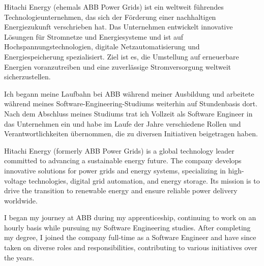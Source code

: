 \begin{cvparagraph}
	{
		Hitachi Energy (ehemals ABB Power Grids) ist ein weltweit führendes Technologieunternehmen, das sich der Förderung einer nachhaltigen Energiezukunft verschrieben hat. Das Unternehmen entwickelt innovative Lösungen für Stromnetze und Energiesysteme und ist auf Hochspannungstechnologien, digitale Netzautomatisierung und Energiespeicherung spezialisiert. Ziel ist es, die Umstellung auf erneuerbare Energien voranzutreiben und eine zuverlässige Stromversorgung weltweit sicherzustellen.
		
		Ich begann meine Laufbahn bei ABB während meiner Ausbildung und arbeitete während meines Software-Engineering-Studiums weiterhin auf Stundenbasis dort. Nach dem Abschluss meines Studiums trat ich Vollzeit als Software Engineer in das Unternehmen ein und habe im Laufe der Jahre verschiedene Rollen und Verantwortlichkeiten übernommen, die zu diversen Initiativen beigetragen haben.
	}
	{
		Hitachi Energy (formerly ABB Power Grids) is a global technology leader committed to advancing a sustainable energy future. The company develops innovative solutions for power grids and energy systems, specializing in high-voltage technologies, digital grid automation, and energy storage. Its mission is to drive the transition to renewable energy and ensure reliable power delivery worldwide.
		
		I began my journey at ABB during my apprenticeship, continuing to work on an hourly basis while pursuing my Software Engineering studies. After completing my degree, I joined the company full-time as a Software Engineer and have since taken on diverse roles and responsibilities, contributing to various initiatives over the years.
}
\end{cvparagraph}


